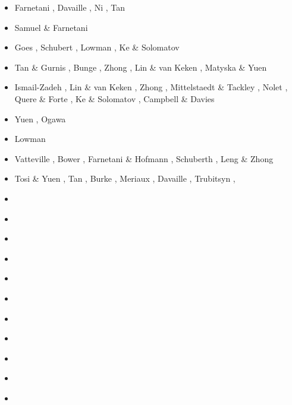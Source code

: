 \begin{scriptsize}
\begin{itemize}
\item[\twothousandtwo] Farnetani \etal \cite{falt02}, Davaille \etal \cite{dagl02},
                       Ni \etal \cite{nitg02}, Tan \etal \cite{tagh02}
\item[\twothousandthree] Samuel \& Farnetani \cite{safa03}
\item[\twothousandfour] Goes \etal \cite{goch04}, Schubert \etal \cite{scmo04}, Lowman \etal \cite{lokg04},
                        Ke \& Solomatov \cite{keso04} 
\item[\twothousandfive] Tan \& Gurnis \cite{tagu05}, Bunge \cite{bung05}, Zhong \cite{zhon05}, 
                        Lin \& van Keken \cite{liva05}, Matyska \& Yuen \cite{mayu05}
\item[\twothousandsix] Ismail-Zadeh \etal \cite{isst06}, Lin \& van Keken \cite{liva06a,liva06b}, 
                       Zhong \cite{zhon06}, Mittelstaedt \& Tackley \cite{mita06},
                       Nolet \etal \cite{nokm06}, Quere \& Forte \cite{qufo06}, 
                       Ke \& Solomatov \cite{keso06}, Campbell \& Davies \cite{cada06}
\item[\twothousandseven] Yuen \etal \cite{yumh07}, Ogawa \cite{ogaw07}
\item[\twothousandeight] Lowman \etal \cite{logg08} 
\item[\twothousandnine] Vatteville \etal \cite{vavl09}, Bower \etal \cite{bogj09},
                        Farnetani \& Hofmann \cite{faho09}, Schuberth \etal \cite{scbs09b},
                        Leng \& Zhong \cite{lezh09}
\item[\twothousandeleven] Tosi \& Yuen \cite{toyu11}, Tan \etal \cite{talz11},
                          Burke \cite{burk11}, Meriaux \etal \cite{memm11}, 
                          Davaille \etal \cite{dalt11}, Trubitsyn \etal \cite{tree11},
\item[\twothousandtwelve] 
\textcite{viym12} 
\item[\twothousandthirteen] 
\textcite{dagm13} 
\textcite{madd13} 
\textcite{ande13} 
\textcite{vadv13} 
\textcite{bova13} 
\textcite{dusm13} 
\item[\twothousandfourteen] 
\textcite{glfo14} 
\item[\twothousandfifteen] 
\textcite{daso15} 
\textcite{hafg15} 
\textcite{hels15}
\item[\twothousandsixteen] 
\textcite{kili16}
\textcite{jodc16}
\textcite{shpy16}
\textcite{dannbergphd}
\item[\twothousandseventeen] 
\textcite{moyu17} 
\textcite{lizh17} 
\item[\twothousandeighteen] 
\textcite{dacc18} 
\textcite{trev18} 
\textcite{zhli18} 
\textcite{moyu18} 
\item[\twothousandnineteen] 
\textcite{argc19} 
\textcite{lizh19} 
\item[\twothousandtwenty] 
\textcite{gugm20} 
\textcite{rits20} 
\textcite{hect20b} 
\item[\twothousandtwentyone] 
\textcite{kobj21} 
\textcite{xiwk21} 
\item[\twothousandtwentythree] 
\textcite{li__23} 
\end{itemize}
\end{scriptsize}


